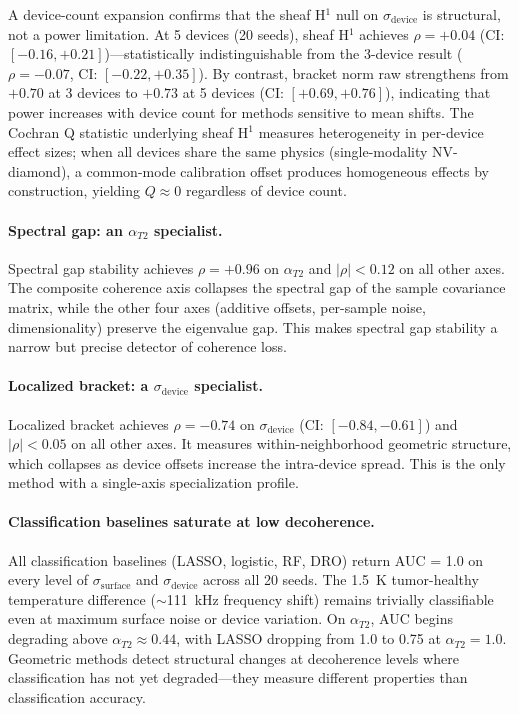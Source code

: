\documentclass[11pt]{article}
\begin{document}
A device-count expansion confirms that the sheaf H$^1$ null on
$\sigma_\text{device}$ is structural, not a power limitation.
At 5 devices (20 seeds), sheaf H$^1$ achieves $\rho = +0.04$
(CI: $[-0.16, +0.21]$)---statistically indistinguishable from the
3-device result ($\rho = -0.07$, CI: $[-0.22, +0.35]$).  By
contrast, bracket norm raw strengthens from $+0.70$ at 3 devices
to $+0.73$ at 5 devices (CI: $[+0.69, +0.76]$), indicating that
power increases with device count for methods sensitive to mean
shifts.  The Cochran Q statistic underlying sheaf H$^1$ measures
heterogeneity in per-device effect sizes; when all devices share
the same physics (single-modality NV-diamond), a common-mode
calibration offset produces homogeneous effects by construction,
yielding $Q \approx 0$ regardless of device count.

\paragraph{Spectral gap: an $\alpha_{T2}$ specialist.}
Spectral gap stability achieves $\rho = +0.96$ on $\alpha_{T2}$ and
$|\rho| < 0.12$ on all other axes.  The composite coherence axis
collapses the spectral gap of the sample covariance matrix, while
the other four axes (additive offsets, per-sample noise, dimensionality)
preserve the eigenvalue gap.  This makes spectral gap stability a
narrow but precise detector of coherence loss.

\paragraph{Localized bracket: a $\sigma_\text{device}$ specialist.}
Localized bracket achieves $\rho = -0.74$ on $\sigma_\text{device}$
(CI: $[-0.84, -0.61]$) and $|\rho| < 0.05$ on all other axes.
It measures within-neighborhood geometric structure, which collapses
as device offsets increase the intra-device spread.  This is the only
method with a single-axis specialization profile.

\paragraph{Classification baselines saturate at low decoherence.}
All classification baselines (LASSO, logistic, RF, DRO) return AUC =
1.0 on every level of $\sigma_\text{surface}$ and
$\sigma_\text{device}$ across all 20 seeds.  The 1.5~K tumor-healthy
temperature difference ($\sim$111~kHz frequency shift) remains
trivially classifiable even at maximum surface noise or device
variation.  On $\alpha_{T2}$, AUC begins degrading above
$\alpha_{T2} \approx 0.44$, with LASSO dropping from 1.0 to 0.75 at
$\alpha_{T2} = 1.0$.  Geometric methods detect structural changes at
decoherence levels where classification has not yet degraded---they
measure different properties than classification accuracy.
\end{document}
